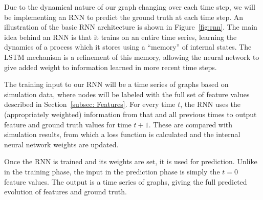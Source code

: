 Due to the dynamical nature of our graph changing over each time step, we will be implementing an RNN to predict the ground truth at each time step. An illustration of the basic RNN architecture is shown in Figure~\ref{fig:rnn}.  The main idea behind an RNN is that it trains on an entire time series, learning the dynamics of a process which it stores using a ``memory'' of internal states.  The LSTM mechanism is a refinement of this memory, allowing the neural network to give added weight to information learned in more recent time steps.

The training input to our RNN will be a time series of graphs based on simulation data, where nodes will be labeled with the full set of feature values described in Section~\ref{subsec: Features}.  For every time $t$, the RNN uses the (appropriately weighted) information from that and all previous times to output feature and ground truth values for time $t+1$.  These are compared with simulation results, from which a loss function is calculated and the internal neural network weights are updated.

Once the RNN is trained and its weights are set, it is used for prediction.  Unlike in the training phase, the input in the prediction phase is simply the $t=0$ feature values.  The output is a time series of graphs, giving the full predicted evolution of features and ground truth.

